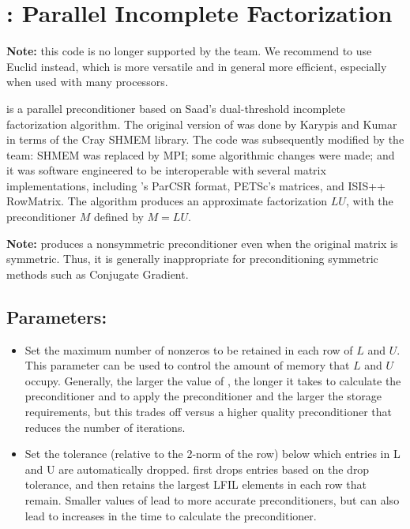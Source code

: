 
\section{\pilut: Parallel Incomplete Factorization}
\label{PILUT}

{\bf Note:} this code is no longer supported by the \hypre{} team. We recommend to 
use Euclid instead, which is more versatile and in general more efficient, especially
when used with many processors.

\vspace{.3in}
\pilut{} is a parallel preconditioner based on Saad's dual-threshold incomplete
factorization algorithm. The original version of \pilut{} was done by Karypis
and Kumar \cite{GKarypis_VKumar_1998} in terms of the Cray SHMEM library. The
code was subsequently modified by the \hypre{} team: SHMEM was replaced by MPI;
some algorithmic changes were made; and it was software engineered to be
interoperable with several matrix implementations, including \hypre{}'s ParCSR
format, PETSc's matrices, and ISIS++ RowMatrix. The algorithm produces an
approximate factorization $ L U$, with the preconditioner $M$ defined by $ M =
L U $.

{\bf Note:} \pilut{} produces a nonsymmetric preconditioner even when the
original matrix is symmetric. Thus, it is generally inappropriate for
preconditioning symmetric methods such as Conjugate Gradient.


\subsection*{Parameters:}

\begin{itemize}

\item
{}
Set the maximum number of nonzeros to be retained in each row of $L$ and $U$.
This parameter can be used to control the amount of memory that $L$ and $U$
occupy. Generally, the larger the value of , the longer it takes to
calculate the preconditioner and to apply the preconditioner and the larger
the storage requirements, but this trades
off versus a higher quality preconditioner that reduces the number of
iterations.

\item
{}
Set the tolerance (relative to the 2-norm of the row) below which entries in L
and U are automatically dropped. \pilut{} first drops entries based on the drop
tolerance, and then retains the largest LFIL elements in each row that remain.
Smaller values of  lead to more accurate preconditioners, but can
also lead to increases in the time to calculate the preconditioner.

\end{itemize}

